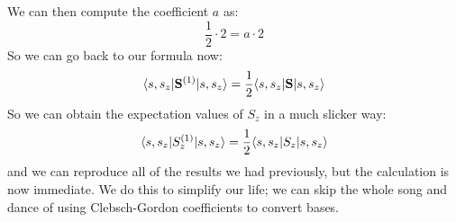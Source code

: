 We can then compute the coefficient $a$ as:
\begin{equation}
    \frac{1}{2}\cdot 2 = a \cdot 2
\end{equation}
So we can go back to our formula now:
\begin{equation}
    \langle s,s_z \rvert\mathbf{S}^{(1)} \lvert s,s_z \rangle = \frac{1}{2}\langle s,s_z \rvert\mathbf{S}\lvert s, s_z \rangle
\end{equation}
So we can obtain the expectation values of $S_z$ in a much slicker way:
\begin{equation}
    \langle s,s_z \rvert S_z^{(1)}\lvert s,s_z \rangle = \frac{1}{2}\langle s, s_z \rvert S_z\lvert s, s_z \rangle
\end{equation}
and we can reproduce all of the results we had previously, but the calculation is now immediate. We do this to simplify our life; we can skip the whole song and dance of using Clebsch-Gordon coefficients to convert bases.